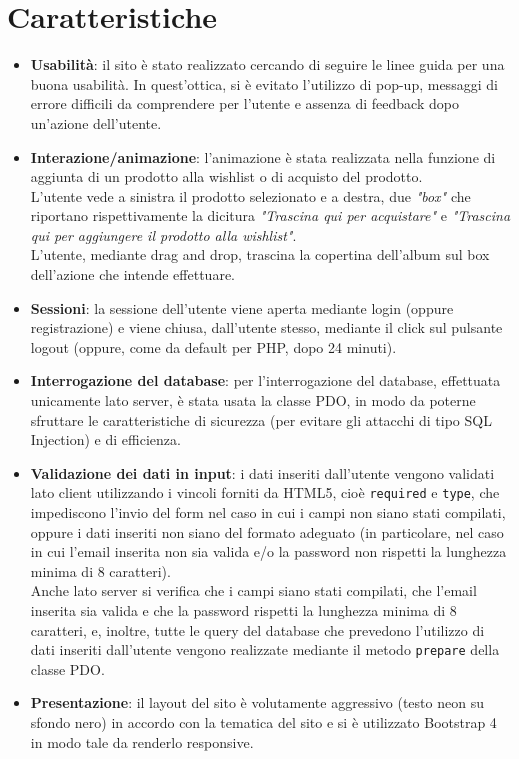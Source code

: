 \section{Caratteristiche}
\begin{itemize}
    \item \textbf{Usabilità}: il sito è stato realizzato cercando di seguire le linee guida per una buona usabilità. In quest'ottica, si è evitato l'utilizzo di pop-up, messaggi di errore difficili da comprendere per l'utente e assenza di feedback dopo un'azione dell'utente.
    \item \textbf{Interazione/animazione}: l'animazione è stata realizzata nella funzione di aggiunta di un prodotto alla wishlist o di acquisto del prodotto.\\
    L'utente vede a sinistra il prodotto selezionato e a destra, due \textit{"box"} che riportano rispettivamente la dicitura \textit{"Trascina qui per acquistare"} e \textit{"Trascina qui per aggiungere il prodotto alla wishlist"}.\\
    L'utente, mediante drag and drop, trascina la copertina dell'album sul box dell'azione che intende effettuare.
    \item \textbf{Sessioni}: la sessione dell'utente viene aperta mediante login (oppure registrazione) e viene chiusa, dall'utente stesso, mediante il click sul pulsante logout (oppure, come da default per PHP, dopo 24 minuti).
    \item \textbf{Interrogazione del database}: per l'interrogazione del database, effettuata unicamente lato server, è stata usata la classe PDO, in modo da poterne sfruttare le caratteristiche di sicurezza (per evitare gli attacchi di tipo SQL Injection) e di efficienza.\\
    \item \textbf{Validazione dei dati in input}: i dati inseriti dall'utente vengono validati lato client utilizzando i vincoli forniti da HTML5, cioè \texttt{required} e \texttt{type}, che impediscono l'invio del form nel caso in cui i campi non siano stati compilati, oppure i dati inseriti non siano del formato adeguato (in particolare, nel caso in cui l'email inserita non sia valida e/o la password non rispetti la lunghezza minima di 8 caratteri).\\
    Anche lato server si verifica che i campi siano stati compilati, che l'email inserita sia valida e che la password rispetti la lunghezza minima di 8 caratteri, e, inoltre, tutte le query del database che prevedono l'utilizzo di dati inseriti dall'utente vengono realizzate mediante il metodo \texttt{prepare} della classe PDO.
    \item \textbf{Presentazione}: il layout del sito è volutamente aggressivo (testo neon su sfondo nero) in accordo con la tematica del sito e si è utilizzato Bootstrap 4 in modo tale da renderlo responsive.
\end{itemize}